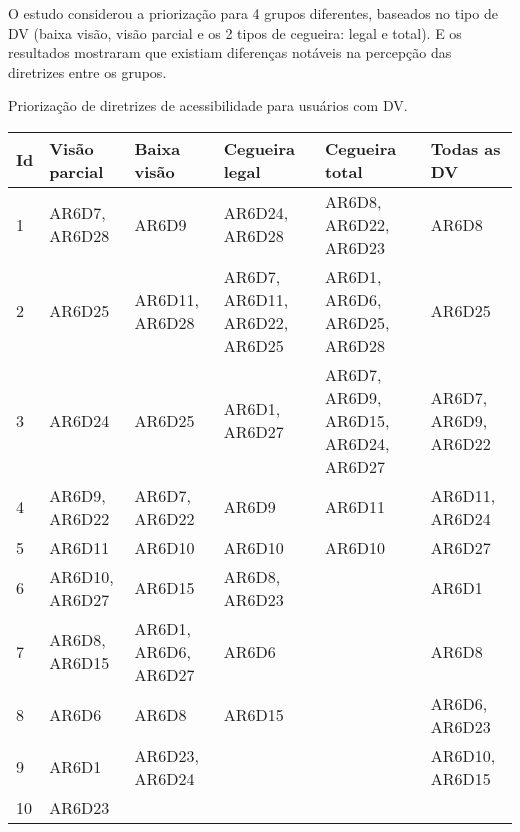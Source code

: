 O estudo considerou a priorização para 4 grupos diferentes, baseados no tipo de DV (baixa visão, visão parcial e os 2 tipos de cegueira: legal e total).
E os resultados mostraram que existiam diferenças notáveis na percepção das diretrizes entre os grupos.

\begin{quadro}[htb!]
  \begin{center}
    \ABNTEXfontereduzida
    \caption{\label{qua-pri-acc-gui}Priorização de diretrizes de acessibilidade para usuários com DV.}
    \begin{tabular}{|m{0.5cm} | m{2.4cm} | m{2.4cm} | m{2.8cm} | m{3.0cm} | m{2.4cm}|}
      \hline
      \textbf{Id} & \textbf{Visão parcial} & \textbf{Baixa visão} & \textbf{Cegueira legal}       & \textbf{Cegueira total}              & \textbf{Todas as DV} \\
      \hline
      1           & AR6D7, AR6D28          & AR6D9                & AR6D24, AR6D28                & AR6D8, AR6D22, AR6D23                & AR6D8                \\
      \hline
      2           & AR6D25                 & AR6D11, AR6D28       & AR6D7, AR6D11, AR6D22, AR6D25 & AR6D1, AR6D6, AR6D25, AR6D28         & AR6D25               \\
      \hline
      3           & AR6D24                 & AR6D25               & AR6D1, AR6D27                 & AR6D7, AR6D9, AR6D15, AR6D24, AR6D27 & AR6D7, AR6D9, AR6D22 \\
      \hline
      4           & AR6D9, AR6D22          & AR6D7, AR6D22        & AR6D9                         & AR6D11                               & AR6D11, AR6D24       \\
      \hline
      5           & AR6D11                 & AR6D10               & AR6D10                        & AR6D10                               & AR6D27               \\
      \hline
      6           & AR6D10, AR6D27         & AR6D15               & AR6D8, AR6D23                 & \-                                   & AR6D1                \\
      \hline
      7           & AR6D8, AR6D15          & AR6D1, AR6D6, AR6D27 & AR6D6                         & \-                                   & AR6D8                \\
      \hline
      8           & AR6D6                  & AR6D8                & AR6D15                        & \-                                   & AR6D6, AR6D23        \\
      \hline
      9           & AR6D1                  & AR6D23, AR6D24       & \-                            & \-                                   & AR6D10, AR6D15       \\
      \hline
      10          & AR6D23                 & \-                   & \-                            & \-                                   & \-                   \\
      \hline
    \end{tabular}
  \end{center}
\end{quadro}

